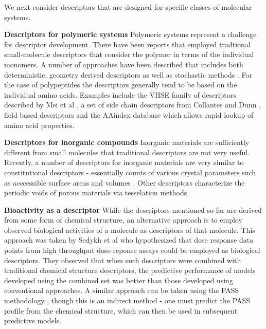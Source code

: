 \documentclass[letterpaper, 12pt]{article}
\begin{document}
We next consider descriptors that are designed for specific classes of
molecular systems.

\textbf{Descriptors for polymeric systems} Polymeric systems represent
a challenge for descriptor development. There have been reports that
employed tradtional small-molecule descriptors
\cite{Mattioni:2002dq,Katritzky:1998cr} that consider the polymer in
terms of the individual monomers. A number of approaches have been
described that includes both deterministic, geometry derived
descriptors \cite{Edvinsson:2003bh} as well as stochastic methods
\cite{Gonzales-Diaz:2003ly}. For the case of polypeptides the
descriptors generally tend to be based on the individual amino
acids. Examples include the VHSE family of descriptors described by
Mei et al \cite{Mei:2005kx}, a set of side chain descriptors from
Collantes and Dunn \cite{Collantes:1995vn}, field based descriptors
\cite{Norinder:1991ys} and the AAindex database
\cite{Kawashima:1999zr} which allows rapid lookup of amino acid
properties.

\textbf{Descriptors for inorganic compounds} Inorganic materials are
sufficiently different from small molecules that traditional
descriptors are not very useful. Recently, a number of descriptors for
inorganic materials are very similar to constitutional descriptors -
essentially counts of various crystal parameters such as acccessible
surface areas and volumes
\cite{Willems:2012zr,Haranczyk:2010ys,Mackay:1984ve}. Other
descriptors characterize the periodic voids of porous materials via
tesselation methods \cite{Anurova:2009ly,Carr:2009kx}

\textbf{Bioactivity as a descriptor} While the descriptors mentioned
so far are derived from some form of chemical structure, an
alternative approach is to employ observed biological activities of a
molecule as descriptors of that molecule.  This approach was taken by
Sedykh et al \cite{Sedykh:2011fk} who hypothesized that dose response
data points from high throughput dose-reponse assays could be employed
as biological descriptors. They observed that when such descriptors
were combined with traditional chemical structure descriptors, the
predictive performance of models developed using the combined set was
better than those developed using conventional approaches. A similar
approach can be taken using the PASS methodology
\cite{Poroikov:2007aa}, though this is an indirect method - one must
predict the PASS profile from the chemical structure, which can then
be used in subsequent predictive models.
\end{document}
